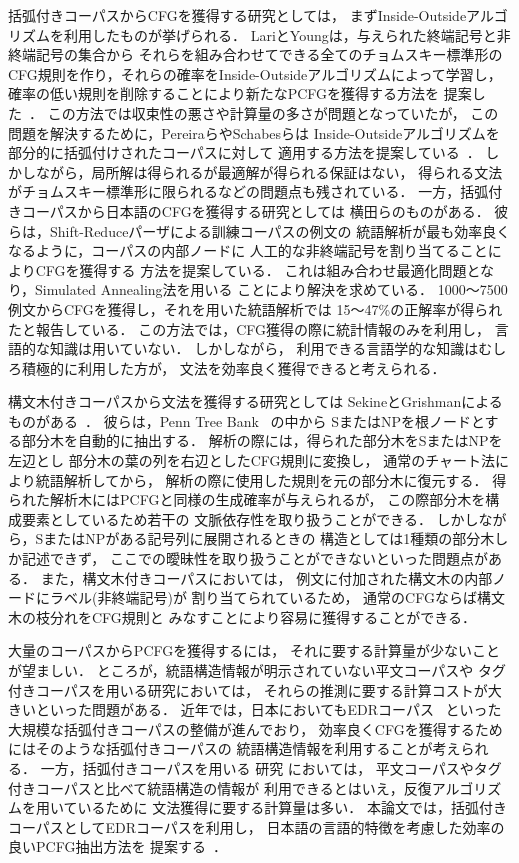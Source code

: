 括弧付きコーパスからCFGを獲得する研究としては，
まずInside-Outsideアルゴリズムを利用したものが挙げられる．
LariとYoungは，与えられた終端記号と非終端記号の集合から
それらを組み合わせてできる全てのチョムスキー標準形の
CFG規則を作り，それらの確率をInside-Outsideアルゴリズムによって学習し，
確率の低い規則を削除することにより新たなPCFGを獲得する方法を
提案した~．
この方法では収束性の悪さや計算量の多さが問題となっていたが，
この問題を解決するために，PereiraらやSchabesらは
Inside-Outsideアルゴリズムを部分的に括弧付けされたコーパスに対して
適用する方法を提案している~．
しかしながら，局所解は得られるが最適解が得られる保証はない，
得られる文法がチョムスキー標準形に限られるなどの問題点も残されている．
一方，括弧付きコーパスから日本語のCFGを獲得する研究としては
横田らのものがある．
彼らは，Shift-Reduceパーザによる訓練コーパスの例文の
統語解析が最も効率良くなるように，コーパスの内部ノードに
人工的な非終端記号を割り当てることによりCFGを獲得する
方法を提案している．
これは組み合わせ最適化問題となり，Simulated Annealing法を用いる
ことにより解決を求めている．
1000〜7500例文からCFGを獲得し，それを用いた統語解析では
15〜47\%の正解率が得られたと報告している．
この方法では，CFG獲得の際に統計情報のみを利用し，
言語的な知識は用いていない．
しかしながら，
利用できる言語学的な知識はむしろ積極的に利用した方が，
文法を効率良く獲得できると考えられる．

構文木付きコーパスから文法を獲得する研究としては
SekineとGrishmanによるものがある~．
彼らは，Penn Tree Bank~ の中から
SまたはNPを根ノードとする部分木を自動的に抽出する．
解析の際には，得られた部分木をSまたはNPを左辺とし
部分木の葉の列を右辺としたCFG規則に変換し，
通常のチャート法により統語解析してから，
解析の際に使用した規則を元の部分木に復元する．
得られた解析木にはPCFGと同様の生成確率が与えられるが，
この際部分木を構成要素としているため若干の
文脈依存性を取り扱うことができる．
しかしながら，SまたはNPがある記号列に展開されるときの
構造としては1種類の部分木しか記述できず，
ここでの曖昧性を取り扱うことができないといった問題点がある．
また，構文木付きコーパスにおいては，
例文に付加された構文木の内部ノードにラベル(非終端記号)が
割り当てられているため，
通常のCFGならば構文木の枝分れをCFG規則と
みなすことにより容易に獲得することができる．

大量のコーパスからPCFGを獲得するには，
それに要する計算量が少ないことが望ましい．
ところが，統語構造情報が明示されていない平文コーパスや
タグ付きコーパスを用いる研究においては，
それらの推測に要する計算コストが大きいといった問題がある．
近年では，日本においてもEDRコーパス~ といった
大規模な括弧付きコーパスの整備が進んでおり，
効率良くCFGを獲得するためにはそのような括弧付きコーパスの
統語構造情報を利用することが考えられる．
一方，括弧付きコーパスを用いる
研究 においては，
平文コーパスやタグ付きコーパスと比べて統語構造の情報が
利用できるとはいえ，反復アルゴリズムを用いているために
文法獲得に要する計算量は多い．
本論文では，括弧付きコーパスとしてEDRコーパスを利用し，
日本語の言語的特徴を考慮した効率の良いPCFG抽出方法を
提案する~．

